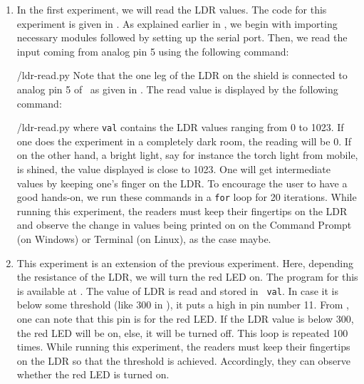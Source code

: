 \begin{enumerate}
\item In the first experiment, we will read the LDR values. The code for this experiment is given in
. As explained earlier in , we begin with 
importing necessary modules followed by setting up the serial port. 
Then, we read the input coming from analog pin 5 using the
following command:

{\LocLDRpycode/ldr-read.py} Note that the one leg of the LDR on
the shield is connected to analog pin 5 of \arduino\, 
as given in . The read value is displayed 
 by the following command: 

{\LocLDRpycode/ldr-read.py} where {\tt val} contains
the LDR values ranging from 0 to 1023. If one does the experiment in a completely dark room, the
reading will be 0. If on the other hand, a bright light, say for instance the torch
light from mobile, is shined, the value displayed is close to 1023. One will get
intermediate values by keeping one's finger on the LDR. To
encourage the user to have a good hands-on, we run these commands in
a {\tt for} loop for 20 iterations. While running this experiment, the readers must keep their fingertips on the LDR and
observe the change in values being printed on on the
Command Prompt (on Windows) or Terminal (on Linux), as the case maybe.

\item This experiment is an extension of the previous experiment. Here, depending the resistance of the LDR, we will
  turn the red LED on.  The program for this is available at
  .  The value of LDR is read and stored in {\tt
    val}.  In case it is below some threshold (like 300 in ), 
    it puts a high in pin number 11.  From , 
    one can note that this pin is for the red LED.  If the LDR value is below 300, 
    the red LED will be on, else, it will be turned off.  
    This loop is repeated 100 times. While running this experiment, the readers 
    must keep their fingertips on the LDR so that the threshold is achieved. Accordingly, 
    they can observe whether the red LED is turned on. 


\end{enumerate}

